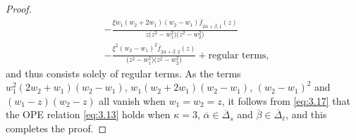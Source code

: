 \documentclass[10pt,a4paper]{amsart}
\numberwithin{equation}{section}
\begin{document}
\begin{proof}
\begin{align}
&-\frac{\xi w_1(w_2+2w_1)(w_2-w_1)\overline{f}_{ 2\overline{\alpha}+\overline{\beta},1}(z)}{z\bigl(z^2-w_1^2\bigr)\bigl(z^2-w_2^2\bigr)}\nonumber\\
&-\frac{\xi^2(w_2-w_1)^2\overline{f}_{ 2\overline{\alpha}+\overline{\beta},2}(z)}{\bigl(z^2-w_1^2\bigr)\bigl(z^2-w_2^2\bigr)}+\text{regular terms},\label{eq:3.17}
\end{align}
and thus  consists solely of regular terms. As the terms $w_1^2(2w_2+w_1)(w_2-w_1)$, $w_1(w_2+2w_1)(w_2-w_1)$, $(w_2-w_1)^2$ and $(w_1-z)(w_2-z)$ all vanish when $w_1=w_2=z$, it follows from \eqref{eq:3.17} that the OPE relation \eqref{eq:3.13} holds when $\kappa=3$, $\overline{\alpha}\in\overline{\Delta}_s$ and $\overline{\beta}\in\overline{\Delta}_{\ell}$, and this completes the proof.
\end{proof}
\end{document}
